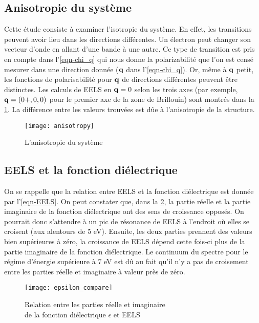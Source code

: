 \subsection{Anisotropie du système}
Cette étude consiste à examiner l'isotropie du système.
En effet, les transitions peuvent avoir lieu dans les directions différentes.
Un électron peut changer son vecteur d'onde en allant d'une bande à une autre.
Ce type de transition est pris en compte dans l'\cref{eqn-chi_q} qui nous donne la polarizabilité
que l'on est censé mesurer dans une direction donnée ($\vb{q}$ dans l'\cref{eqn-chi_q}).
Or, même à $\vb{q}$ petit, les fonctions de polarisabilité pour $\vb{q}$ de directions différentes peuvent être distinctes.
Les calculs de EELS en $\vb{q} = 0$ selon les trois axes
(par exemple, $\vb{q}=(0+,0,0)$ pour le premier axe de la zone de Brillouin)
sont montrés dans la \cref{fig-anisotropie}.
La différence entre les valeurs trouvées est dûe à l'anisotropie de la structure.

\begin{figure}[!h]
    \centering
    \texttt{[image: anisotropy]}
    \caption{L'anisotropie du système}\label{fig-anisotropie}
\end{figure}

\subsection{EELS et la fonction diélectrique}
On se rappelle que la relation entre EELS et la fonction diélectrique est donnée par l'\cref{eqn-EELS}.
On peut constater que, dans la \cref{fig-epsilon_compare}, la partie réelle et
la partie imaginaire de la fonction diélectrique ont des sens de croissance opposés.
On pourrait donc s'attendre à un pic de résonance de EELS à l'endroit où elles se croisent
(aux alentours de 5 eV).
Ensuite, les deux parties prennent des valeurs bien supérieures à zéro,
la croissance de EELS dépend cette fois-ci plus de la partie imaginaire de la fonction diélectrique.
Le continuum du spectre pour le régime d'énergie supérieure à 7 eV est dû au fait
qu'il n'y a pas de croisement entre les parties réelle et imaginaire à valeur près de zéro.

\begin{figure}[!h]
    \centering
    \texttt{[image: epsilon\_compare]}
    \caption{Relation entre les parties réelle et imaginaire\\ de la fonction diélectrique $\epsilon$ et EELS}\label{fig-epsilon_compare}
\end{figure}
\clearpage

